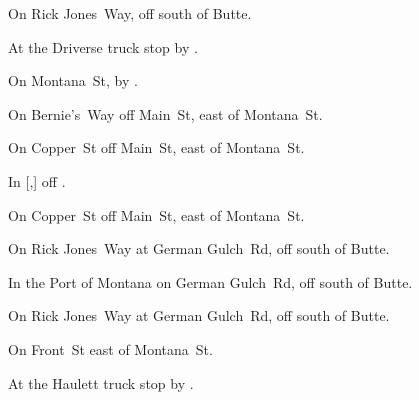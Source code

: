 

\begin{LocationList}

On Rick Jones~Way, off   south of Butte.

At the Driverse truck stop by   .

On Montana~St, by   .

On Bernie's~Way off Main~St, east of Montana~St.

On Copper~St off Main~St, east of Montana~St.

In [,] off  .

On Copper~St off Main~St, east of Montana~St.

On Rick Jones~Way at German Gulch~Rd, off   south of Butte.

In the Port of Montana on German Gulch~Rd, off   south of Butte.

On Rick Jones~Way at German Gulch~Rd, off   south of Butte.

On Front~St east of Montana~St.

\Location{\TruckService \Service \Gas \Rest}
At the Haulett truck stop by   .

\end{LocationList}
